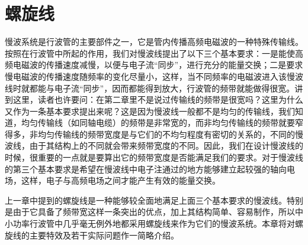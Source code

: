 \chapter{螺旋线}
慢波系统是行波管的主要部件之一，它是管内传播高频电磁波的一种特殊传输线。按照在行波管中所起的作用，我们对慢波线提出了以下三个基本要求：一是能使高频电磁波的传播速度减慢，以便与电子流“同步”，进行充分的能量交换；二是要求慢电磁波的传播速度随频率的变化尽量小，这样，当不同频率的电磁波进入该慢波线时就都能与电子流“同步”，因而都能得到放大，行波管的频带就能做得很宽。讲到这里，读者也许要问：在第二章里不是说过传输线的频带是很宽吗？这里为什么又作为一条基本要求提出来呢？这是因为慢波线一般都不是均匀的传输线，我们知道，均匀传输线（如同轴电缆）的频带是非常宽的，而非均匀传输线的频带就要窄得多，非均匀传输线的频带宽度是与它们的不均匀程度有密切的关系的，不同的慢波线，由于其结构上的不同就会带来频带宽度的不同。因此，我们在设计慢波线的时候，很重要的一点就是要算出它的频带宽度是否能满足我们的要求。对于慢波线的第三个基本要求是希望在慢波线中电子注通过的地方能够建立起较强的轴向电场，这样，电子与高频电场之间才能产生有效的能量交换。

上一章中提到的螺旋线是一种能够较全面地满足上面三个基本要求的慢波线。特别是由于它具备了频带宽这样一条突出的优点，加上其结构简单、容易制作，所以中小功率行波管中几乎毫无例外地都采用螺旋线来作为它们的慢波系统。本章将对螺旋线的主要特效及若干实际问题作一简略介绍。
